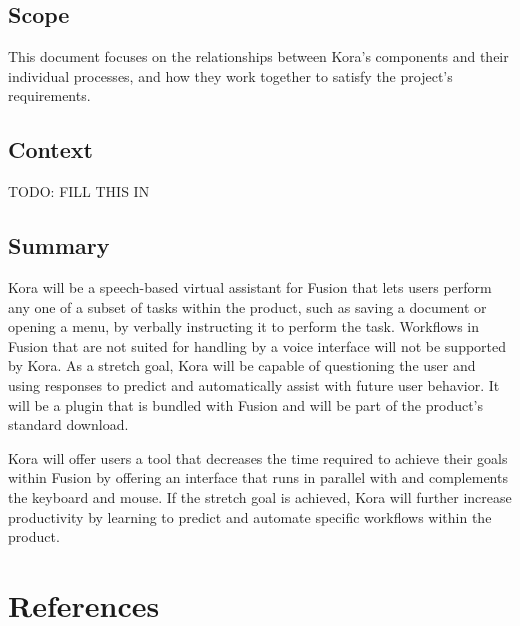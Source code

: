 \documentclass[onecolumn, draftclsnofoot,10pt, compsoc]{IEEEtran}
\begin{document}
	\subsection{Scope}
		This document focuses on the relationships between Kora's components and their individual processes, and how they work together to satisfy the project's requirements.
	
    \subsection{Context}
        TODO: FILL THIS IN

	\subsection{Summary}
		Kora will be a speech-based virtual assistant for Fusion that lets users perform any one of a subset of tasks within the product, such as saving a document or opening a menu, by verbally instructing it to perform the task.
		Workflows in Fusion that are not suited for handling by a voice interface will not be supported by Kora.
		As a stretch goal, Kora will be capable of questioning the user and using responses to predict and automatically assist with future user behavior.
		It will be a plugin that is bundled with Fusion and will be part of the product's standard download. 
		
		Kora will offer users a tool that decreases the time required to achieve their goals within Fusion by offering an interface that runs in parallel with and complements the keyboard and mouse.
		If the stretch goal is achieved, Kora will further increase productivity by learning to predict and automate specific workflows within the product.
    
\section{References}
\end{document}
